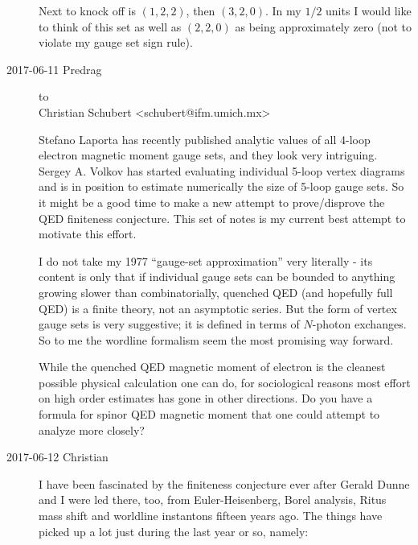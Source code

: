 \begin{description}
Next to knock off is $(1,2,2)$, then $(3,2,0)$. In my $1/2$ units I would
like to think of this set as well as $(2,2,0)$ as being approximately zero
(not to violate my gauge set sign rule).




\newpage
\item[2017-06-11 Predrag] to
\\
Christian Schubert <schubert@ifm.umich.mx>
%
%

Stefano Laporta  has recently published analytic values of all 4-loop
electron magnetic moment gauge sets, and they look very intriguing.
Sergey  A. Volkov has started evaluating individual 5-loop vertex
diagrams and is in position to estimate numerically the size of 5-loop
gauge sets. So it might be a good time to make a new attempt to prove/disprove
the QED finiteness conjecture. This set of notes is my current best attempt
to motivate this effort.

I do not take my 1977 ``gauge-set approximation'' very literally - its
content is only that if individual gauge sets can be bounded to anything
growing slower than combinatorially, quenched QED (and hopefully full
QED) is a finite theory, not an asymptotic series. But the form of vertex
gauge sets is very suggestive; it is defined in terms of $N$-photon
exchanges. So to me the wordline formalism seem the most promising way
forward.

While the quenched QED magnetic moment of electron is the cleanest
possible physical calculation one can do, for sociological reasons most
effort on high order estimates has gone in other directions. Do you have
a formula for spinor QED magnetic moment that one could attempt to
analyze more closely?


\item[2017-06-12 Christian]
I have been
fascinated by the finiteness conjecture ever after Gerald Dunne and I
were led there, too, from Euler-Heisenberg, Borel analysis,
Ritus mass shift and worldline instantons fifteen years ago.
The things have picked up a lot
just during the last year or so, namely:


\end{description}
